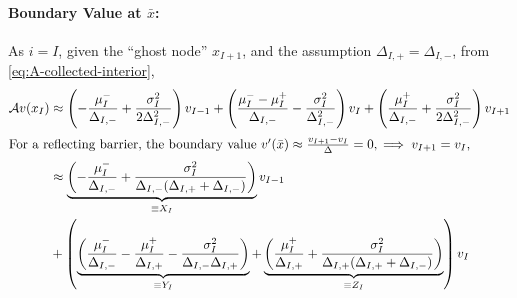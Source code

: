 \documentclass[11pt]{etk-article}
\begin{document}
\paragraph{Boundary Value at $\bar{x}$:}
As $i=I$, given the ``ghost node'' $x_{I+1}$, and the assumption  $\Delta_{I,+} = \Delta_{I,-}$, from \cref{eq:A-collected-interior},
\begin{align}
\mathcal{A}  v(x_I)&\approx \left(-\frac{\mu_I^{-}}{\Delta_{I,-}} +\frac{\sigma_I^2}{2 \Delta_{I,-}^2}\right)v_{I-1} + \left(\frac{\mu_I^{-} - \mu_I^{+}}{\Delta_{I,-}}-\frac{\sigma_I^2}{\Delta_{I,-}^2}\right)v_I + \left(\frac{\mu_I^{+}}{\Delta_{I,-}} + \frac{\sigma_I^2}{2 \Delta_{I,-}^2}\right)v_{I+1}\\
\intertext{For a reflecting barrier, the boundary value $v'(\bar{x}) \approx \frac{v_{I+1}-v_I}{\Delta} = 0, \implies v_{I+1} = v_I$,}
&\approx \underbrace{\left(-\frac{\mu_I^{-}}{\Delta_{I,-}} +\frac{\sigma_I^2}{\Delta_{I,-}(\Delta_{I,+}+\Delta_{I,-})}\right)}_{\equiv X_I} v_{I-1}\nonumber\\
&+ \left(\underbrace{\left(\frac{\mu_I^{-}}{\Delta_{I,-}} - \frac{\mu_I^{+}}{\Delta_{I,+}}-\frac{\sigma_I^2}{\Delta_{I,-}\Delta_{I,+}}\right)}_{\equiv Y_I} + \underbrace{\left(\frac{\mu_I^{+}}{\Delta_{I,+}} + \frac{\sigma_I^2}{\Delta_{I,+}(\Delta_{I,+}+\Delta_{I,-})}\right)}_{\equiv Z_I} \right) v_I \label{eq:reflecting-right-nonuniform}
\end{align}
\end{document}
